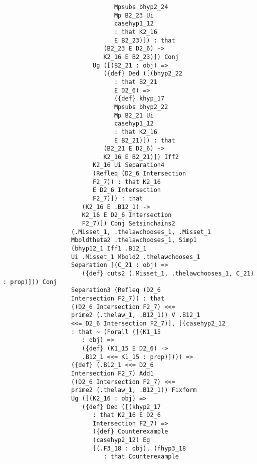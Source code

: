 \documentclass[12pt]{article}
\begin{document}
\begin{verbatim}
                               Mpsubs bhyp2_24 
                               Mp B2_23 Ui 
                               casehyp1_12 
                               : that K2_16 
                               E B2_23)]) : that 
                            (B2_23 E D2_6) -> 
                            K2_16 E B2_23)]) Conj 
                         Ug ([(B2_21 : obj) => 
                            ({def} Ded ([(bhyp2_22 
                               : that B2_21 
                               E D2_6) => 
                               ({def} khyp_17 
                               Mpsubs bhyp2_22 
                               Mp B2_21 Ui 
                               casehyp1_12 
                               : that K2_16 
                               E B2_21)]) : that 
                            (B2_21 E D2_6) -> 
                            K2_16 E B2_21)]) Iff2 
                         K2_16 Ui Separation4 
                         (Refleq (D2_6 Intersection 
                         F2_7)) : that K2_16 
                         E D2_6 Intersection 
                         F2_7)]) : that 
                      (K2_16 E .B12_1) -> 
                      K2_16 E D2_6 Intersection 
                      F2_7)]) Conj Setsinchains2 
                   (.Misset_1, .thelawchooses_1, .Misset_1 
                   Mboldtheta2 .thelawchooses_1, Simp1 
                   (bhyp12_1 Iff1 .B12_1 
                   Ui .Misset_1 Mbold2 .thelawchooses_1 
                   Separation [(C_21 : obj) => 
                      ({def} cuts2 (.Misset_1, .thelawchooses_1, C_21) : prop)])) Conj 
                   Separation3 (Refleq (D2_6 
                   Intersection F2_7)) : that 
                   ((D2_6 Intersection F2_7) <<= 
                   prime2 (.thelaw_1, .B12_1)) V .B12_1 
                   <<= D2_6 Intersection F2_7)], [(casehyp2_12 
                   : that ~ (Forall ([(K1_15 
                      : obj) => 
                      ({def} (K1_15 E D2_6) -> 
                      .B12_1 <<= K1_15 : prop)]))) => 
                   ({def} (.B12_1 <<= D2_6 
                   Intersection F2_7) Add1 
                   ((D2_6 Intersection F2_7) <<= 
                   prime2 (.thelaw_1, .B12_1)) Fixform 
                   Ug ([(K2_16 : obj) => 
                      ({def} Ded ([(khyp2_17 
                         : that K2_16 E D2_6 
                         Intersection F2_7) => 
                         ({def} Counterexample 
                         (casehyp2_12) Eg 
                         [(.F3_18 : obj), (fhyp3_18 
                            : that Counterexample 

\end{verbatim}
\end{document}
